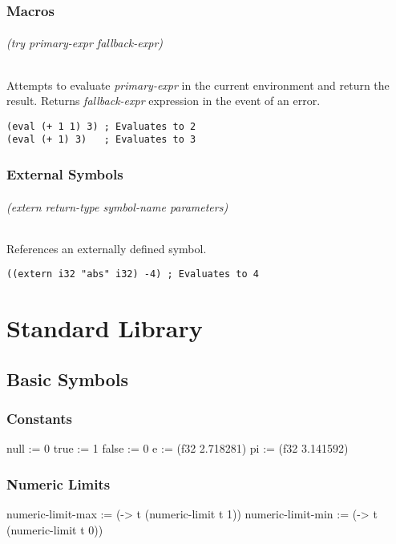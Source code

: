 \documentclass[numbers=noenddot]{scrbook}
\newenvironment{likely}
{ \verbatim }
{ \endverbatim }
\begin{document}
\section{Macros}
\paragraph{(try \emph{primary-expr} \emph{fallback-expr})}
Attempts to evaluate \emph{primary-expr} in the current environment and return the result.
Returns \emph{fallback-expr} expression in the event of an error.

\begin{verbatim}
(eval (+ 1 1) 3) ; Evaluates to 2
(eval (+ 1) 3)   ; Evaluates to 3
\end{verbatim}

\section{External Symbols}
\paragraph{(extern \emph{return-type} \emph{symbol-name} \emph{parameters})}
References an externally defined symbol.

\begin{verbatim}
((extern i32 "abs" i32) -4) ; Evaluates to 4
\end{verbatim}

\part{Standard Library}
\chapter{Basic Symbols}
\section{Constants}
\begin{likely}
null  := 0
true  := 1
false := 0
e  := (f32 2.718281)
pi := (f32 3.141592)
\end{likely}

\section{Numeric Limits}
\begin{likely}
numeric-limit-max := (-> t (numeric-limit t 1))
numeric-limit-min := (-> t (numeric-limit t 0))
\end{likely}
\end{document}
